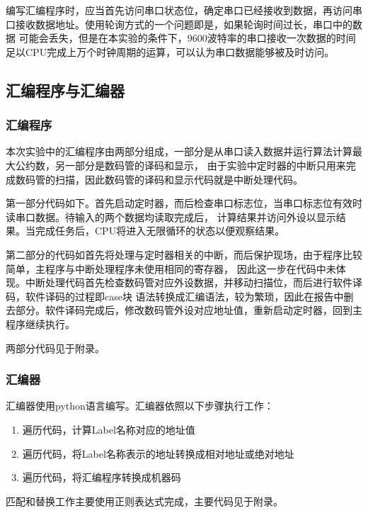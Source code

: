 \documentclass{ctexart}
\begin{document}
			编写汇编程序时，应当首先访问串口状态位，确定串口已经接收到数据，再访问串口接收数据地址。使用轮询方式的一个问题即是，如果轮询时间过长，串口中的数据
			可能会丢失，但是在本实验的条件下，9600波特率的串口接收一次数据的时间足以CPU完成上万个时钟周期的运算，可以认为串口数据能够被及时访问。


		\subsection{汇编程序与汇编器}
		\subsubsection{汇编程序}
			本次实验中的汇编程序由两部分组成，一部分是从串口读入数据并运行算法计算最大公约数，另一部分是数码管的译码和显示，
			由于实验中定时器的中断只用来完成数码管的扫描，因此数码管的译码和显示代码就是中断处理代码。

			第一部分代码如下。首先启动定时器，而后检查串口标志位，当串口标志位有效时读串口数据。待输入的两个数据均读取完成后，
			计算结果并访问外设以显示结果。当完成任务后，CPU将进入无限循环的状态以便观察结果。

			第二部分的代码如首先将处理与定时器相关的中断，而后保护现场，由于程序比较简单，主程序与中断处理程序未使用相同的寄存器，
			因此这一步在代码中未体现。中断处理代码首先检查数码管对应外设数据，并移动扫描位，而后进行软件译码，软件译码的过程即case块
			语法转换成汇编语法，较为繁琐，因此在报告中删去部分。软件译码完成后，修改数码管外设对应地址值，重新启动定时器，回到主程序继续执行。

			两部分代码见于附录。


		\subsubsection{汇编器}
			汇编器使用python语言编写。汇编器依照以下步骤执行工作：
			\begin{enumerate}
				\item 遍历代码，计算Label名称对应的地址值
				\item 遍历代码，将Label名称表示的地址转换成相对地址或绝对地址
				\item 遍历代码，将汇编程序转换成机器码
			\end{enumerate}
			匹配和替换工作主要使用正则表达式完成，主要代码见于附录。
\end{document}
